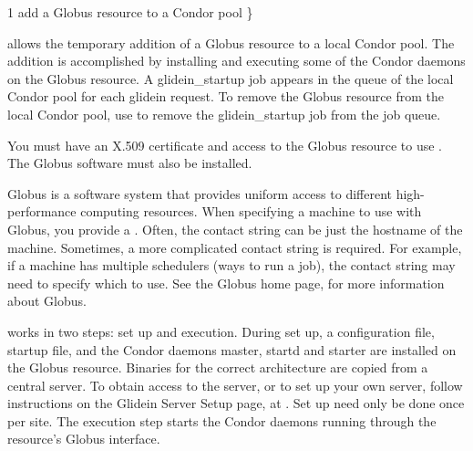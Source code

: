 \begin{ManPage}{\label{man-condor-glidein}}{1}
{add a Globus resource to a Condor pool}
\Synopsis {}
 \} \Bar {}


\Description

 allows the temporary addition of a Globus resource to
a local Condor pool.
The addition is accomplished by installing and executing some of the Condor
daemons on the Globus resource.
A glidein\_startup job appears in the queue of the local
Condor pool for each glidein request.
To remove the Globus resource from the local Condor pool,
use  to remove the glidein\_startup job from
the job queue.

You must have an X.509 certificate and access
to the Globus resource to use .
The Globus software must also be installed.

Globus is a software system that provides uniform access to
different high-performance computing resources.
When specifying a machine to use with Globus,
you provide a .
Often, the contact string can be just the hostname of the machine.
Sometimes, a more complicated contact string is required.
For example, if a machine has multiple schedulers (ways to run a job),
the contact string may need to specify which to use.
See the Globus home page,  for more
information about Globus.

 works in two steps: set up and execution.
During set up, a configuration file, startup file, and the Condor daemons
master, startd and starter are installed on the Globus
resource.
Binaries for the correct architecture are copied from a central server.
To obtain access to the server,
or to set up your own server, follow
instructions on the Glidein Server Setup page,
at .
Set up need only be done once per site.
The execution step starts the Condor daemons running through
the resource's Globus interface.


\end{ManPage}
